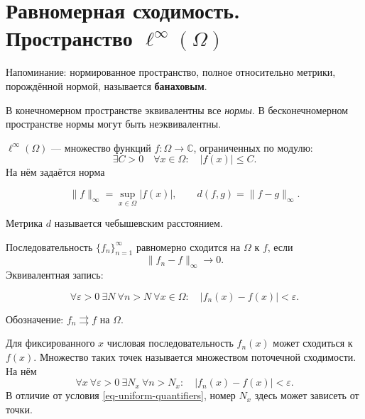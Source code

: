\section{\texorpdfstring{Равномерная сходимость. Пространство \(\ell^\infty(\Omega)\)}{Равномерная сходимость. Пространство ограниченных функций}}\label{sec-sequences-01}

Напоминание: нормированное пространство, полное относительно метрики, порождённой нормой, называется \textbf{банаховым}.

В конечномерном пространстве эквивалентны все \emph{нормы}. В бесконечномерном пространстве нормы могут быть неэквивалентны.

\begin{definition}\label{def-bounded}

\(\ell^\infty(\Omega)\) --- множество функций \(f:\Omega\to\mathbb C\), ограниченных по модулю: \[
\exists C>0\quad\forall x\in\Omega:\quad |f(x)|\le C.
\] На нём задаётся норма

\begin{equation}
\lVert f\rVert_\infty=\sup_{x\in\Omega}|f(x)|,
\qquad d(f,g)=\lVert f-g\rVert_\infty.
\label{eq-sup-norm}
\end{equation}

Метрика \(d\) называется чебышевским расстоянием.

\end{definition}

\begin{definition}\label{def-uniform-sequence}

Последовательность \(\{f_n\}_{n=1}^{\infty}\) равномерно сходится на \(\Omega\) к \(f\), если \[
\lVert f_n-f\rVert_\infty\longrightarrow0.
\] Эквивалентная запись:

\begin{equation}
\forall\varepsilon>0\ \exists N\ \forall n>N\ \forall x\in\Omega:
\quad |f_n(x)-f(x)|<\varepsilon.
\label{eq-uniform-quantifiers}
\end{equation}

Обозначение: \(f_n\rightrightarrows f\) на \(\Omega\).

\end{definition}

\begin{definition}\label{def-pointwise}

Для фиксированного \(x\) числовая последовательность \(f_n(x)\) может сходиться к \(f(x)\). Множество таких точек называется множеством поточечной сходимости. На нём \[
\forall x\ \forall\varepsilon>0\ \exists N_x\ \forall n>N_x:
\quad |f_n(x)-f(x)|<\varepsilon.
\] В отличие от условия \eqref{eq-uniform-quantifiers}, номер \(N_x\) здесь может зависеть от точки.

\end{definition}


